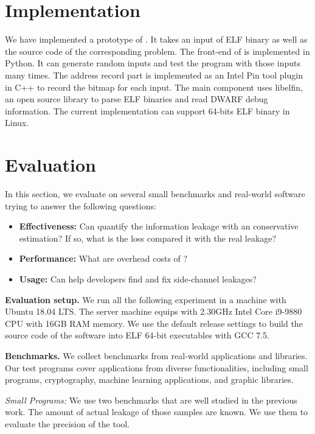 \section{Implementation}
We have implemented a prototype of \ctool{}. It takes an input of ELF binary as well as the source code of the corresponding problem. The front-end of \ctool{} is implemented in Python. It can generate random inputs and test the program with those inputs many times.  The address record part is implemented as an Intel Pin tool plugin in C++ to record the bitmap for each input. The main component uses \textsf{libelfin}, an open source library to parse ELF binaries and read DWARF debug information. The current implementation can support  64-bits ELF binary in Linux. 

\section{Evaluation}
In this section, we evaluate \ctool{} on several small benchmarks and real-world software trying to answer the following questions:

\begin{itemize}
\item \textbf{Effectiveness:} Can \ctool{} quantify the information leakage with an conservative estimation? If so, what is the loss compared it with the real leakage?
\item \textbf{Performance:} What are overhead costs of \ctool{}?
\item \textbf{Usage:}  Can \ctool{} help developers find and fix side-channel leakages?
\end{itemize}

\textbf{Evaluation setup.} We run all the following experiment in a machine with Ubuntu 18.04 LTS. The server machine equips with 2.30GHz Intel Core i9-9880 CPU with 16GB RAM memory. We use the default release settings to build the source code of the software into ELF 64-bit executables with GCC 7.5. 

\textbf{Benchmarks.} 
We collect benchmarks from real-world applications and libraries. Our test programs cover applications from diverse functionalities, including small programs, cryptography, machine learning applications, and graphic libraries. 

\textit{Small Programs:} We use two benchmarks that are well studied in the previous work. The amount of actual leakage of those samples are known. We use them to evaluate the precision of the tool.

